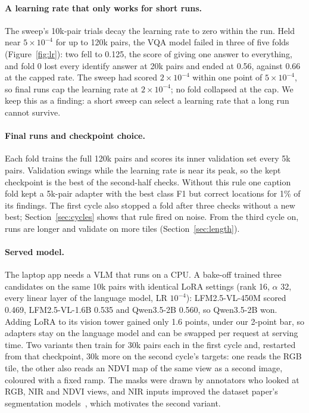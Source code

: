 \documentclass[10pt,twocolumn]{article}
\begin{document}
\paragraph{A learning rate that only works for short runs.} The sweep's 10k-pair trials decay the learning rate to zero within the run. Held near $5\!\times\!10^{-4}$ for up to 120k pairs, the VQA model failed in three of five folds (Figure~\ref{fig:lr}): two fell to 0.125, the score of giving one answer to everything, and fold 0 lost every identify answer at 20k pairs and ended at 0.56, against 0.66 at the capped rate. The sweep had scored $2\!\times\!10^{-4}$ within one point of $5\!\times\!10^{-4}$, so final runs cap the learning rate at $2\!\times\!10^{-4}$; no fold collapsed at the cap. We keep this as a finding: a short sweep can select a learning rate that a long run cannot survive.

\paragraph{Final runs and checkpoint choice.} Each fold trains the full 120k pairs and scores its inner validation set every 5k pairs. Validation swings while the learning rate is near its peak, so the kept checkpoint is the best of the second-half checks. Without this rule one caption fold kept a 5k-pair adapter with the best class F1 but correct locations for 1\% of its findings. The first cycle also stopped a fold after three checks without a new best; Section~\ref{sec:cycles} shows that rule fired on noise. From the third cycle on, runs are longer and validate on more tiles (Section~\ref{sec:length}).

\paragraph{Served model.} The laptop app needs a VLM that runs on a CPU. A bake-off trained three candidates on the same 10k pairs with identical LoRA settings (rank 16, $\alpha$ 32, every linear layer of the language model, LR $10^{-4}$): LFM2.5-VL-450M scored 0.469, LFM2.5-VL-1.6B 0.535 and Qwen3.5-2B 0.560, so Qwen3.5-2B won. Adding LoRA to its vision tower gained only 1.6 points, under our 2-point bar, so adapters stay on the language model and can be swapped per request at serving time. Two variants then train for 30k pairs each in the first cycle and, restarted from that checkpoint, 30k more on the second cycle's targets: one reads the RGB tile, the other also reads an NDVI map of the same view as a second image, coloured with a fixed ramp. The masks were drawn by annotators who looked at RGB, NIR and NDVI views, and NIR inputs improved the dataset paper's segmentation models~\cite{chiu2020agriculture}, which motivates the second variant.
\end{document}

